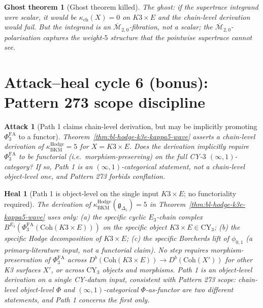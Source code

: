 \documentclass[11pt]{article}
\newtheorem{attack}[theorem]{Attack}
\newtheorem{heal}[theorem]{Heal}
\newtheorem{ghost}[theorem]{Ghost theorem}
\providecommand{\CY}{\mathrm{CY}}
\providecommand{\Ethree}{E_3}
\providecommand{\Coh}{\mathrm{Coh}}
\providecommand{\fg}{\mathfrak{g}}
\providecommand{\kch}{\kappa_{\mathrm{ch}}}
\providecommand{\kHodge}{\kappa_{\mathrm{BKM}}^{\mathrm{Hodge}}}
\providecommand{\Mbar}{\overline{\mathcal M}}
\providecommand{\PhiFA}{\Phi^{\mathrm{FA}}}
\begin{document}
\begin{ghost}[Ghost theorem killed]
\label{ghost:supertrace-scalar-BL-2}
The ghost: if the supertrace integrand were scalar, it would be
$\kch(X) = 0$ on $K3 \times E$ and the chain-level derivation would
fail. But the integrand is an $\Mbar_{2, 0}$-fibration, not a scalar;
the $\Mbar_{2, 0}$-polarisation captures the weight-$5$ structure
that the pointwise supertrace cannot see.
\end{ghost}

\section{Attack--heal cycle 6 (bonus): Pattern 273 scope discipline}
\label{sec:attack-cycle-6}

\begin{attack}[Path 1 claims chain-level derivation, but may be implicitly promoting $\PhiFA_3$ to a functor]
\label{att:pattern-273-BL-2}
Theorem~\ref{thm:bl-hodge-k3e-kappa5-wave} asserts a chain-level
derivation of $\kHodge = 5$ for $X = K3 \times E$. Does the derivation
implicitly require $\PhiFA_3$ to be functorial (i.e.\ morphism-preserving)
on the full CY-$3$ $(\infty, 1)$-category? If so, Path 1 is an
$(\infty, 1)$-categorical statement, not a chain-level object-level one,
and Pattern 273 forbids conflation.
\end{attack}

\begin{heal}[Path 1 is object-level on the single input $K3 \times E$; no functoriality required]
\label{heal:pattern-273-BL-2}
The derivation of $\kHodge(\fg_{\Delta_5}) = 5$ in
Theorem~\ref{thm:bl-hodge-k3e-kappa5-wave} uses only:
(a) the specific cyclic $\Ethree$-chain complex
$B^{\Ethree}(\PhiFA_3(\Coh(K3 \times E)))$ on the specific object
$K3 \times E \in \CY_3$;
(b) the specific Hodge decomposition of $K3 \times E$;
(c) the specific Borcherds lift of $\phi_{0, 1}$ (a \emph{primary-literature}
input, not a functorial claim).
No step requires morphism-preservation of $\PhiFA_3$ across
$D^b(\Coh(K3 \times E)) \to D^b(\Coh(X'))$ for other K3 surfaces $X'$,
or across $\CY_3$ objects and morphisms. Path 1 is an object-level
derivation on a single CY-datum input, consistent with Pattern 273
scope: chain-level object-level $\Phi$ and $(\infty, 1)$-categorical
$\Phi$-as-functor are two different statements, and Path 1 concerns
the first only.
\end{heal}
\end{document}
